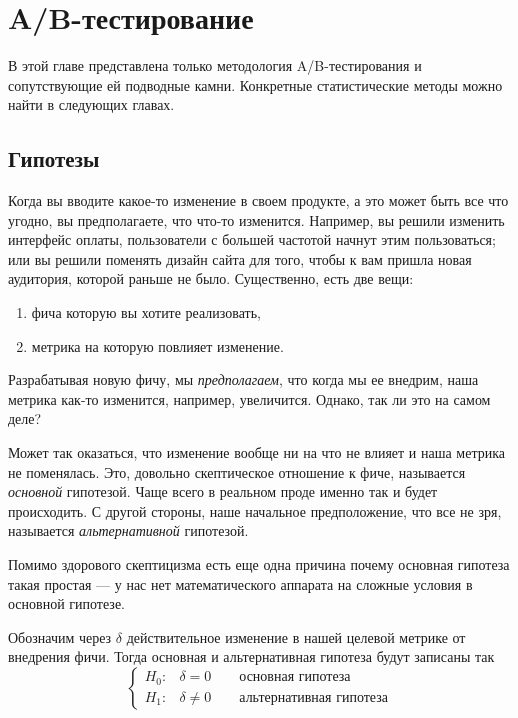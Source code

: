 \documentclass[../handbook.tex]{subfiles}
\begin{document}
\chapter{A\slash B-тестирование}

В этой главе представлена только методология A/B-тестирования и сопутствующие
ей подводные камни. Конкретные статистические методы можно найти в следующих
главах.

\section{Гипотезы}

Когда вы вводите какое-то изменение в своем продукте, а это может быть все что
угодно, вы предполагаете, что что-то изменится. Например, вы решили изменить
интерфейс оплаты, пользователи с большей частотой начнут этим пользоваться; или
вы решили поменять дизайн сайта для того, чтобы к вам пришла новая аудитория,
которой раньше не было. Существенно, есть две вещи:
\begin{enumerate}
    \item фича которую вы хотите реализовать,
    \item метрика на которую повлияет изменение.
\end{enumerate}
Разрабатывая новую фичу, мы \emph{предполагаем}, что когда мы ее внедрим, наша
метрика как-то изменится, например, увеличится. Однако, так ли это на самом
деле?

Может так оказаться, что изменение вообще ни на что не влияет и наша метрика не
поменялась. Это, довольно скептическое отношение к фиче, называется
\emph{основной} гипотезой. Чаще всего в реальном проде именно так и будет
происходить. С другой стороны, наше начальное предположение, что все не зря,
называется \emph{альтернативной} гипотезой.

Помимо здорового скептицизма есть еще одна причина почему основная гипотеза
такая простая --- у нас нет математического аппарата на сложные условия в
основной гипотезе.

Обозначим через $\delta$ действительное изменение в нашей целевой метрике от внедрения фичи. Тогда основная и альтернативная гипотеза будут записаны так
\begin{equation*}
    \begin{cases}
        H_0: & \delta = 0 \qquad\text{основная гипотеза}\\
        H_1: & \delta \ne 0 \qquad\text{альтернативная гипотеза}
    \end{cases}
\end{equation*}
\end{document}
